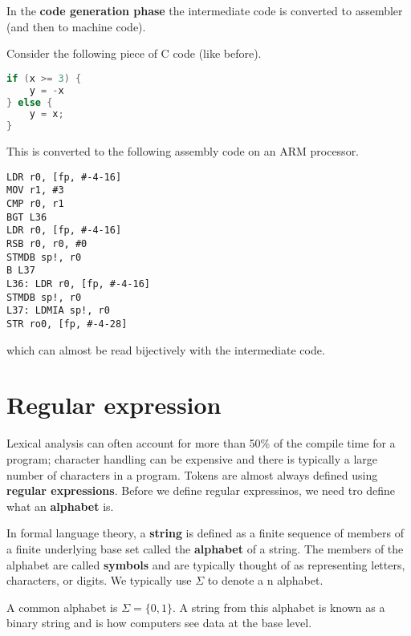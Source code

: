\begin{definition}
    In the \textbf{code generation phase} the intermediate code is converted to assembler (and then to machine code).
\end{definition}

\begin{example}
    Consider the following piece of C code (like before).
    \begin{lstlisting}[language = C]
if (x >= 3) {
    y = -x
} else {
    y = x;
}
    \end{lstlisting}
    This is converted to the following assembly code on an ARM processor.    
    \begin{lstlisting}
LDR r0, [fp, #-4-16]
MOV r1, #3
CMP r0, r1
BGT L36
LDR r0, [fp, #-4-16]
RSB r0, r0, #0
STMDB sp!, r0
B L37
L36: LDR r0, [fp, #-4-16]
STMDB sp!, r0
L37: LDMIA sp!, r0
STR ro0, [fp, #-4-28]
    \end{lstlisting}
    which can almost be read bijectively with the intermediate code.
\end{example}

\section{Regular expression}

Lexical analysis can often account for more than 50\% of the compile time for a program; character handling can be expensive and there is typically a large number of characters in a program. Tokens are almost always defined using \textbf{regular expressions}. Before we define regular expressinos, we need tro define what an \textbf{alphabet} is.

\begin{definition}
    In formal language theory, a \textbf{string} is defined as a finite sequence of members of a finite underlying base set called the \textbf{alphabet} of a string. The members of the alphabet are called \textbf{symbols} and are typically thought of as representing letters, characters, or digits. We typically use $\Sigma$ to denote a n alphabet.
\end{definition}

\begin{example}
    A common alphabet is $\Sigma = \{ 0 , 1 \}$. A string from this alphabet is known as a binary string and is how computers see data at the base level.
\end{example}

